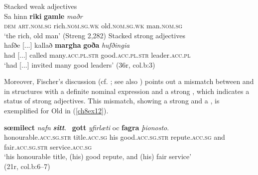 \documentclass[output=paper,colorlinks,citecolor=brown]{langscibook}
\begin{document}
\begin{exe}
\ex\label{ch8ex11}
\begin{xlist}
\ex\label{ch8ex11a}Stacked weak adjectives\\
\gll Sa hinn \textbf{riki} \textbf{gamle} \textit{maðr}\\
\textsc{dem} \textsc{art.nom.sg} rich.\textsc{nom.sg.wk} old.\textsc{nom.sg.wk} man.\textsc{nom.sg}\\
\glt `the rich, old man' (Streng 2,282)
\ex\label{ch8ex11b}Stacked strong adjectives\\
\gll   hafðe [...] kallað \textbf{margha} \textbf{goða} \textit{hufðingia} \\
had [...] called many.\textsc{acc.pl.str} good.\textsc{acc.pl.str} leader.\textsc{acc.pl}\\
\glt `had [...] invited many good leaders' (36r, col.b:3)
\end{xlist}
\end{exe}

Moreover, Fischer's discussion (cf. \citeyear[257ff]{Fischer01}; see also \cite[260f]{Haumann03}) points out a mismatch between  and  in structures with a definite nominal expression and a strong , which indicates a  status of strong adjectives. This  mismatch, showing a strong 
and a , is exemplified for Old  in (\ref{ch8ex12}).

\begin{exe}
\ex\label{ch8ex12}
\gll \textbf{sœmilect} \textit{nafn} \textbf{\textit{sitt}}. ~\textbf{gott} \textit{yfirlæti} oc \textbf{fagra} \textit{þionosto}.\\
honourable.\textsc{acc.sg.str} title.\textsc{acc.sg} his good.\textsc{acc.sg.str} repute.\textsc{acc.sg} and fair.\textsc{acc.sg.str} service.\textsc{acc.sg}\\
\glt `his honourable title, (his) good repute, and (his) fair service'\\(21r, col.b:6--7)
\end{exe}
\end{document}
